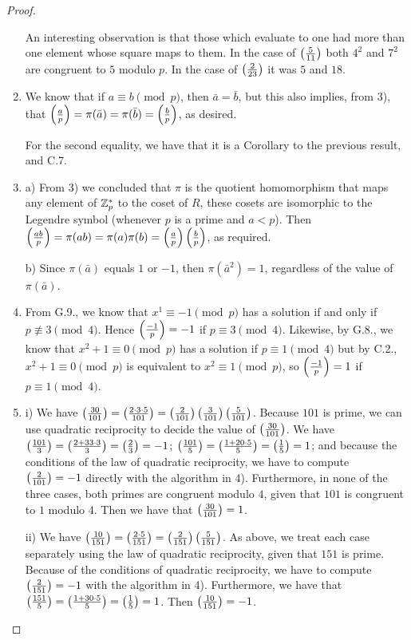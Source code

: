 \begin{proof}
\begin{enumerate}
    An interesting observation is that those which evaluate to one had more than one element whose square maps to them. In the case of $\left( \frac{5}{11}\right)$ both $4^{2}$ and $7^{2}$ are congruent to $5$ modulo $p$. In the case of $\left( \frac{2}{23}\right)$ it was $5$ and $18$.
     \item We know that if $a\equiv b\pmod{p}$, then $\bar{a}=\bar{b}$, but this also implies, from 3), that $\left( \frac{a}{p}\right)=\pi(\bar{a})=\pi(\bar{b})=\left( \frac{b}{p}\right)$, as desired.
     
     For the second equality, we have that it is a Corollary to the previous result, and C.7.
     \item a) From 3) we concluded that $\pi$ is the quotient homomorphism that maps any element of $\mathbb{Z}^{*}_{p}$ to the coset of $R$, these cosets are isomorphic to the Legendre symbol (whenever $p$ is a prime and $a<p$). Then $\left( \frac{ab}{p}\right)=\pi(ab)=\pi(a)\pi(b)=\left( \frac{a}{p}\right)\left( \frac{b}{p}\right)$, as required.

     b) Since $\pi(\bar{a})$ equals $1$ or $-1$, then $\pi(\bar{a}^{2})=1$, regardless of the value of $\pi(\bar{a})$.
     \item From G.9., we know that $x^{1}\equiv -1\pmod{p}$ has a solution if and only if $p\not\equiv 3\pmod{4}$. Hence $\left( \frac{-1}{p}\right)=-1$ if $p\equiv 3\pmod{4}$. Likewise, by G.8., we know that $x^{2}+1\equiv 0\pmod{p}$ has a solution if $p\equiv 1\pmod{4}$ but by C.2., $x^{2}+1\equiv 0\pmod{p}$ is equivalent to $x^{2}\equiv 1\pmod{p}$, so $\left( \frac{-1}{p}\right)=1$ if $p\equiv 1\pmod{4}$.
     \item 
     i) We have $\left( \frac{30}{101}\right)= \left( \frac{2\cdot 3\cdot 5}{101}\right)= \left( \frac{2}{101}\right)\left( \frac{3}{101}\right)\left( \frac{5}{101}\right)$. Because $101$ is prime, we can use quadratic reciprocity to decide the value of $\left( \frac{30}{101}\right)$. We have $\left( \frac{101}{3}\right)= \left( \frac{2+33\cdot 3}{3}\right)= \left( \frac{2}{3}\right)=-1$; $\left( \frac{101}{5}\right)= \left( \frac{1+20\cdot 5}{5}\right)= \left( \frac{1}{5}\right)=1$; and because the conditions of the law of quadratic reciprocity, we have to compute $\left( \frac{2}{101}\right)=-1$ directly with the algorithm in 4). Furthermore, in none of the three cases, both primes are congruent modulo $4$, given that $101$ is congruent to $1$ modulo $4$. Then we have that $\left( \frac{30}{101}\right)=1$.
     

     ii) We have $\left( \frac{10}{151}\right)= \left( \frac{2\cdot 5}{151}\right)= \left( \frac{2}{151}\right)\left( \frac{5}{151}\right)$. As above, we treat each case separately using the law of quadratic reciprocity, given that $151$ is prime. Because of the conditions of quadratic reciprocity, we have to compute $\left( \frac{2}{151}\right)=-1$ with the algorithm in 4). Furthermore, we have that $\left( \frac{151}{5}\right)= \left( \frac{1+30\cdot 5}{5}\right)= \left( \frac{1}{5}\right)= 1$. Then $\left( \frac{10}{151}\right)=-1$.


\end{enumerate}
\end{proof}
